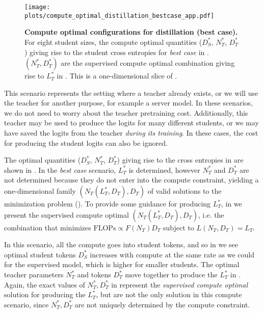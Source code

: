\begin{figure}[h]
	\centering
	\texttt{[image: plots/compute\_optimal\_distillation\_bestcase\_app.pdf]}
    \vspace{-0.25cm}
	\caption{\textbf{Compute optimal configurations for distillation (best case).} For eight student sizes, the compute optimal quantities ($D_S^*$, $N_T^*$, $D_T^*$) giving rise to the student cross entropies for \emph{best case} in 
. $(N_T^*,D_T^*)$ are the supervised compute optimal combination giving rise to $L_T^*$ in .
This is a one-dimensional slice of .
	}
    \vspace{-0.25cm}
	\label{fig:compute-optimal-distillation-bestcase-app}
\end{figure}

This scenario represents the setting where a teacher already exists, or we will use the teacher for another purpose, for example a server model. 
In these scenarios, we do not need to worry about the teacher pretraining cost.
Additionally, this teacher may be used to produce the logits for many different students, or
we may have saved the logits from the teacher \emph{during its training}.
In these cases, the cost for producing the student logits can also be ignored.

The optimal quantities ($D_S^*$, $N_T^*$, $D_T^*$) giving rise to the cross entropies in 
are shown in .
In the \emph{best case} scenario, $L_T^*$ is determined, however $N_T^*$ and $D_T^*$ are not determined because they do not enter into the compute constraint, yielding a one-dimensional family $(N_T(L_T^*,D_T),D_T)$ of valid solutions to the minimization problem ().
To provide some guidance for producing $L_T^*$, in 
we present the supervised compute optimal $(N_T(L_T^*,D_T),D_T)$,
i.e. the combination that minimizes $\mathrm{FLOPs}\propto F(N_T) D_T$ subject to $L(N_T,D_T)=L_T$.

In this scenario, all the compute goes into student tokens,
and so in  we see optimal student tokens $D_S^*$ increases with compute at the same rate as we could for the supervised model, which is higher for smaller  students.
The optimal teacher parameters $N_T^*$ and tokens $D_T^*$ move together to produce the $L_T^*$ in 
.
Again, the exact values of $N_T^*,D_T^*$ in 
represent the \emph{supervised compute optimal} solution for producing the $L_T^*$, but are not the only solution in this compute scenario,
since $N_T^*,D_T^*$  are not uniquely determined by the compute constraint.



